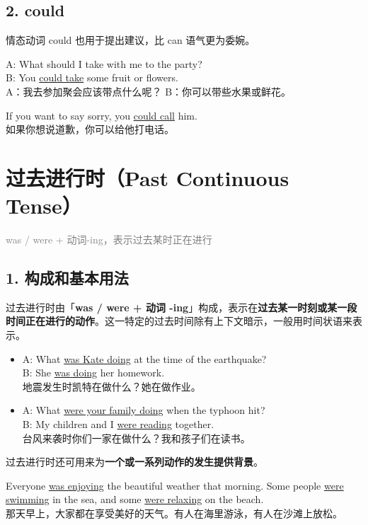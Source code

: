\documentclass[11pt,a4paper]{ctexart}
\begin{document}
\subsection*{2. could}

情态动词 could 也用于提出建议，比 can 语气更为委婉。

A: What should I take with me to the party?\\ B: You \underline{could take} some fruit or flowers.\\ A：我去参加聚会应该带点什么呢？ B：你可以带些水果或鲜花。

If you want to say sorry, you \underline{could call} him.\\ 如果你想说道歉，你可以给他打电话。

\section{过去进行时（Past Continuous Tense）}
\noindent\textcolor{gray}{was / were + 动词-ing，表示过去某时正在进行}\par\smallskip
\subsection*{1. 构成和基本用法}

过去进行时由「\textbf{was / were + 动词 -ing}」构成，表示在\textbf{过去某一时刻或某一段时间正在进行的动作}。这一特定的过去时间除有上下文暗示，一般用时间状语来表示。

\begin{itemize}[leftmargin=1.4em]
\item A: What \underline{was Kate doing} at the time of the earthquake?\\ B: She \underline{was doing} her homework.\\ 地震发生时凯特在做什么？她在做作业。
\item A: What \underline{were your family doing} when the typhoon hit?\\ B: My children and I \underline{were reading} together.\\ 台风来袭时你们一家在做什么？我和孩子们在读书。
\end{itemize}

过去进行时还可用来为\textbf{一个或一系列动作的发生提供背景}。

Everyone \underline{was enjoying} the beautiful weather that morning. Some people \underline{were swimming} in the sea, and some \underline{were relaxing} on the beach.\\ 那天早上，大家都在享受美好的天气。有人在海里游泳，有人在沙滩上放松。
\end{document}

